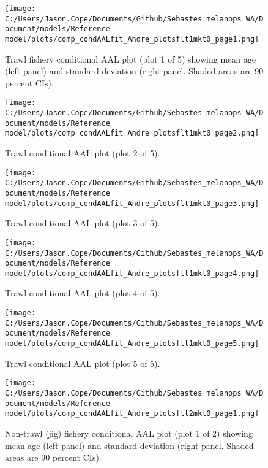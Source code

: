 \documentclass[11pt,
  english,
  letterpaper,
]{article}
\begin{document}
\begin{figure}
\centering
\texttt{[image: C:/Users/Jason.Cope/Documents/Github/Sebastes\_melanops\_WA/Document/models/Reference model/plots/comp\_condAALfit\_Andre\_plotsflt1mkt0\_page1.png]}
\caption{Trawl fishery conditional AAL plot (plot 1 of 5) showing mean age (left panel) and standard deviation (right panel. Shaded areas are 90 percent CIs).\label{fig:comp_condAALfit_Andre_plotsflt1mkt0_page1}}
\end{figure}

\begin{figure}
\centering
\texttt{[image: C:/Users/Jason.Cope/Documents/Github/Sebastes\_melanops\_WA/Document/models/Reference model/plots/comp\_condAALfit\_Andre\_plotsflt1mkt0\_page2.png]}
\caption{Trawl conditional AAL plot (plot 2 of 5).\label{fig:comp_condAALfit_Andre_plotsflt1mkt0_page2}}
\end{figure}

\begin{figure}
\centering
\texttt{[image: C:/Users/Jason.Cope/Documents/Github/Sebastes\_melanops\_WA/Document/models/Reference model/plots/comp\_condAALfit\_Andre\_plotsflt1mkt0\_page3.png]}
\caption{Trawl conditional AAL plot (plot 3 of 5).\label{fig:comp_condAALfit_Andre_plotsflt1mkt0_page3}}
\end{figure}

\begin{figure}
\centering
\texttt{[image: C:/Users/Jason.Cope/Documents/Github/Sebastes\_melanops\_WA/Document/models/Reference model/plots/comp\_condAALfit\_Andre\_plotsflt1mkt0\_page4.png]}
\caption{Trawl conditional AAL plot (plot 4 of 5).\label{fig:comp_condAALfit_Andre_plotsflt1mkt0_page4}}
\end{figure}

\begin{figure}
\centering
\texttt{[image: C:/Users/Jason.Cope/Documents/Github/Sebastes\_melanops\_WA/Document/models/Reference model/plots/comp\_condAALfit\_Andre\_plotsflt1mkt0\_page5.png]}
\caption{Trawl conditional AAL plot (plot 5 of 5).\label{fig:comp_condAALfit_Andre_plotsflt1mkt0_page5}}
\end{figure}

\begin{figure}
\centering
\texttt{[image: C:/Users/Jason.Cope/Documents/Github/Sebastes\_melanops\_WA/Document/models/Reference model/plots/comp\_condAALfit\_Andre\_plotsflt2mkt0\_page1.png]}
\caption{Non-trawl (jig) fishery conditional AAL plot (plot 1 of 2) showing mean age (left panel) and standard deviation (right panel. Shaded areas are 90 percent CIs).\label{fig:comp_condAALfit_Andre_plotsflt2mkt0_page1}}
\end{figure}
\end{document}
